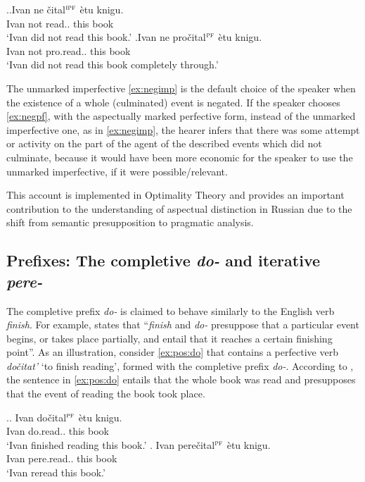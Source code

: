 \ex.\ag.\label{ex:negimp}Ivan ne \v{c}ital$^{\textsc{ipf}}$ \`{e}tu knigu.\\
Ivan not read.. this book\\
\trans `Ivan did not read this book.'
\bg.\label{ex:negpf}Ivan ne pro\v{c}ital$^{\textsc{pf}}$ \`{e}tu knigu.\\
Ivan not pro.read.. this book\\
\trans `Ivan did not read this book completely through.'\\

The unmarked imperfective \ref{ex:negimp} is the default choice of the speaker when the existence of a whole (culminated) event is negated.
If the speaker chooses \ref{ex:negpf}, with the aspectually marked perfective form, instead of the unmarked imperfective one, as in \ref{ex:negimp}, the hearer infers that there was some attempt or activity on the part of the agent of the described events which did not culminate, because it would have been more economic for the speaker to use the unmarked imperfective, if it were possible/relevant.

This account is implemented in Optimality Theory \citep{Blutner:00} and provides an important contribution to the understanding of aspectual distinction in Russian due to the shift from semantic presupposition to pragmatic analysis.

\subsection{Prefixes: The completive \textit{do-} and iterative \textit{pere-}}\label{sec:pragm:old:pref}
The completive prefix \textit{do-} is claimed to behave similarly to the English verb \textit{finish}. For example, \citet[75]{Kagan:book} states that ``\textit{finish} and \textit{do-} presuppose that a particular event begins, or takes place partially, and entail that it reaches a certain finishing point''. As an illustration, consider \ref{ex:pos:do} that contains a perfective verb \textit{do\v{c}itat'} `to finish reading', formed with the completive prefix \textit{do-}. According to \citet{Kagan:book}, the sentence in \ref{ex:pos:do} entails that the whole book was read and presupposes that the event of reading the book took place.

\ex.\ag. \label{ex:pos:do}Ivan do\v{c}ital$^{\textsc{pf}}$ \`{e}tu knigu.\\
Ivan do.read.. this book\\
\trans `Ivan finished reading this book.'
\bg. \label{ex:pos:pere}Ivan pere\v{c}ital$^{\textsc{pf}}$ \`{e}tu knigu.\\
Ivan pere.read.. this book\\
\trans `Ivan reread this book.'

